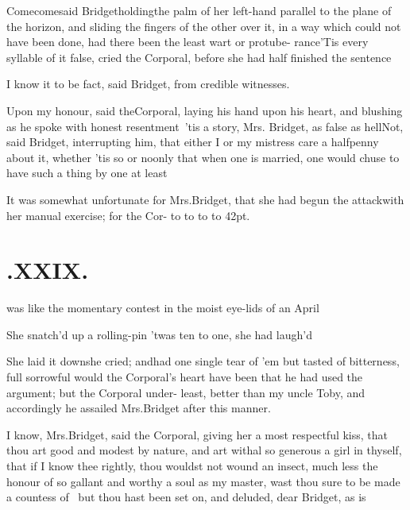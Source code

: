 \documentclass[twoside]{article}
\begin{document}
\vskip -2pt

Come\tsk come\tsk said Bridget\tsk holding\break the palm of her left-hand parallel to the plane
of the horizon, and sliding the fingers of the other over it, in a way which could
not have been done, had there been the least wart or protube- rance\tsh ’Tis
every syllable of it false, cried the Corporal, before she had half finished the
sentence\tsh

\tsk I know it to be fact, said Bridget, from credible
witnesses.

\tsh Upon my honour, said the\break Corporal, laying his hand
upon his\break
heart, and blushing as he spoke with\break
honest resentment\tsk\ ’tis a story, Mrs.\break
Bridget, as false as hell\tsh Not, said\break
Bridget, interrupting him, that either I\break
or my mistress care a halfpenny about it,\break
whether ’tis so or no\tsh only that\break
when one is married, one would chuse\break
to have such a thing by one at least\tsh{}

It was somewhat unfortunate for Mrs.\break Bridget, that she
had begun the attack\break with her manual exercise; for the Cor-\break 
\hbox to 
\hbox to \hsize{\starfill}
\hbox to \hsize{\starfill}
\hbox to 42pt{\starfill}.

\vfill{}\eject

\section{\chapstrut{}.\enspace XXIX.}

 was like the momentary contest in
the moist eye-lids of an April\break
{} 

She snatch’d up a rolling-pin\tsh\break
’twas ten to one, she had laugh’d\tsh

She laid it down\tsh she cried; and\break had one single tear
of ’em but tasted of bitterness, full sorrowful would the
Corporal’s heart have been that he had used the
argument; but the Corporal under-
least, better than my uncle Toby, and\break
accordingly he assailed Mrs.\@ Bridget after this
manner.

I know, Mrs.\@ Bridget, said the Corporal, giving her a
most respectful kiss, that thou art good and modest by nature, and
art withal so generous a girl in thyself, that if I know thee
rightly, thou wouldst not wound an insect, much less the
honour of so gallant and worthy a soul as my master, wast thou sure
to be made a countess of \tsh\ but thou hast been set on,
and deluded, dear Bridget, as is
\end{document}
